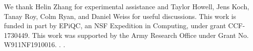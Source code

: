 \begin{acknowledgments}
  We thank Helin Zhang for experimental assistance
  and Taylor Howell, Jens Koch, Tanay Roy, Colm Ryan, and Daniel Weiss for useful discussions.
  This work is funded in part by EPiQC, an NSF Expedition in Computing, under grant CCF-1730449.
  This work was supported by the Army Research Office under Grant No. W911NF1910016.
  .
  .
\end{acknowledgments}
